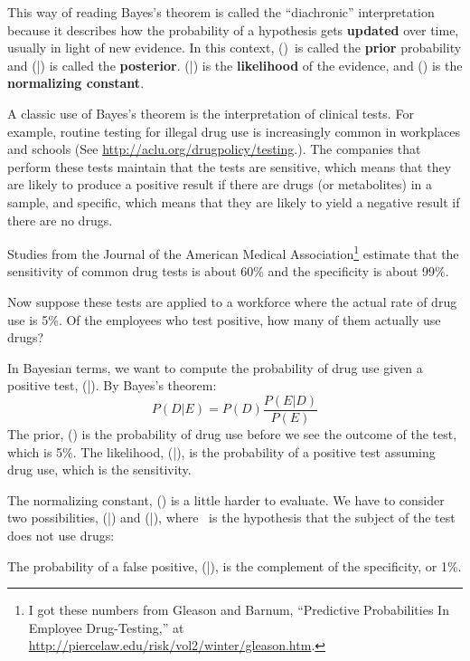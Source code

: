 \documentclass[12pt]{book}
\begin{document}
This way of reading Bayes's theorem is called the ``diachronic''
interpretation because it describes how the probability of a
hypothesis gets {\bf updated} over time, usually in light of new
evidence.  In this context, \Prob(\HH)\ is called the {\bf prior}
probability and \Prob(\HH|\E) is called the {\bf posterior}.
\Prob(\E|\HH) is the {\bf likelihood} of the evidence, and
\Prob(\E) is the {\bf normalizing constant}.

A classic use of Bayes's theorem is the interpretation of clinical
tests.  For example, routine testing for illegal drug use is
increasingly common in workplaces and schools (See
\url{http://aclu.org/drugpolicy/testing}.).  The companies that
perform these tests maintain that the tests are sensitive, which means
that they are likely to produce a positive result if there are drugs
(or metabolites) in a sample, and specific, which means that they are
likely to yield a negative result if there are no drugs.

Studies from the Journal of the American Medical
Association\footnote{I got these numbers from Gleason and Barnum,
  ``Predictive Probabilities In Employee Drug-Testing,'' at
  \url{http://piercelaw.edu/risk/vol2/winter/gleason.htm}.} estimate that
the sensitivity of common drug tests is about 60\% and the specificity
is about 99\%.

Now suppose these tests are applied to a workforce where the
actual rate of drug use is 5\%.  Of the employees who test positive,
how many of them actually use drugs?

In Bayesian terms, we want to compute the probability of
drug use given a positive test, \Prob(\D|\E).  By Bayes's theorem:
%
\[ P(D|E) = P(D) \frac{P(E|D)}{P(E)} \]
%
The prior, \Prob(\D) is the probability of drug use before we
see the outcome of the test, which is 5\%.
The likelihood, \Prob(\E|\D), is the probability
of a positive test assuming drug use, which is the sensitivity.

The normalizing constant, \Prob(\E) is a little harder to evaluate.  We
have to consider two possibilities, \Prob(\E|\D) and \Prob(\E|\N), where
\N~is the hypothesis that the subject of the test does not use drugs:

\Eqn{ \Prob(\E) = \Prob(\D) \Prob(\E|\D)~+~\Prob(\N) \Prob(\E|\N) }

The probability of a false positive, \Prob(\E|\N), is the complement
of the specificity, or 1\%.
\end{document}
